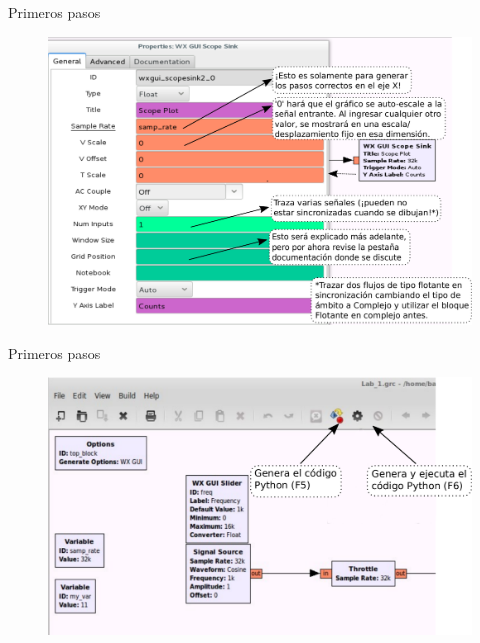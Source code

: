 \begin{frame}{Primeros pasos }
\begin{figure}[H]
\vspace{-3mm}
\centering
\includegraphics[width=.85\textwidth]{parte1/lab1/pdf/lab1_17.pdf}
\end{figure}
\end{frame}

\begin{frame}{Primeros pasos }
\begin{figure}[H]
\centering
\includegraphics[width=\textwidth]{parte1/lab1/pdf/lab1_18.pdf}
\end{figure}
\end{frame}

